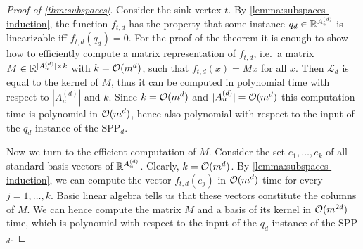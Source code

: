 \begin{proof}[Proof of \cref{thm:subspaces}]
    Consider the sink vertex $t$. By \cref{lemma:subspaces-induction}, the function $f_{t,d}$ has the property that some instance $q_d \in \mathbb{R}^{A_u^{(d)}}$ is linearizable iff $f_{t,d}(q_d) = 0$. 
     For the proof of the theorem it is enough to show  how to efficiently compute a matrix representation of  $f_{t,d}$, i.e.\ a matrix $M\in \mathbb{R}^{|A_u^{(d)}|\times k}$ with  $k = \mathcal{O}(m^d)$, such that $f_{t,d}(x) = Mx$ for all $x$. Then  $\mathcal{L}_d$ is equal to the kernel of $M$, thus  it can be  computed in polynomial time with respect to $|A_u^{(d)}|$ and $k$. Since $k =\mathcal{O}(m^d)$  and $|A_u^{(d)}| =\mathcal{O}(m^d)$ this computation time is polynomial in $\mathcal{O}(m^d)$, hence also polynomial with respect to the input of the $q_d$ instance of the SPP$_d$. 

    Now we turn to the efficient computation of $M$. 
    Consider the set $e_1,\dots, e_k$ of all standard basis vectors of $\mathbb{R}^{A_u^{(d)}}$. Clearly,  $k = \mathcal{O}(m^d)$. By \cref{lemma:subspaces-induction}, we can compute the vector $f_{t,d}(e_j)$ in $\mathcal{O}(m^d)$ time for every $j=1,\dots,k$. Basic linear algebra tells us that these vectors constitute the columns of $M$. We can hence compute the matrix $M$ and a basis of its kernel in $\mathcal{O}(m^{2d})$ time,  which is  polynomial with respect to the input of the $q_d$ instance of the SPP$_d$. 
\end{proof}